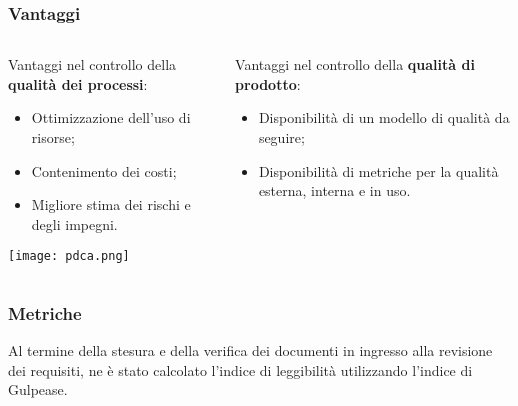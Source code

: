 \begin{frame}
  \frametitle{Vantaggi}
  \begin{columns}
    \begin{column}{0.4\textwidth}
Vantaggi nel controllo della \textbf{qualità dei processi}:
	\begin{itemize}
  	\item Ottimizzazione dell’uso di risorse;
  	\item Contenimento dei costi;
  	\item Migliore stima dei rischi e degli impegni.
	\end{itemize}
	\centering
	\texttt{[image: pdca.png]}
	\end{column}
	\begin{column}{0.4\textwidth}
	Vantaggi nel controllo della \textbf{qualità di prodotto}:
	\begin{itemize}
  	\item Disponibilità di un modello di qualità da seguire;
  	\item Disponibilità di metriche per la qualità esterna, interna e in uso.
	\end{itemize}
	\end{column}
   \end{columns}
\end{frame}

\begin{frame}
  \frametitle{Metriche}
  Al termine della stesura e della verifica dei documenti in ingresso alla revisione dei requisiti, ne è stato calcolato l'indice di leggibilità utilizzando l'indice di Gulpease.
\end{frame}

